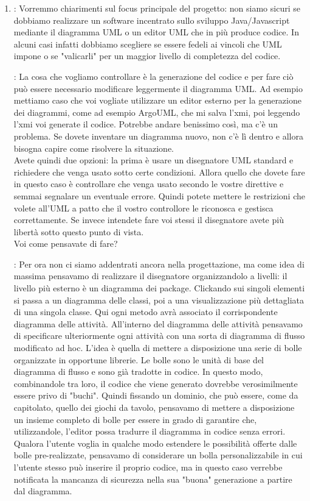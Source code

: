 \documentclass[../AnalisiDeiRequisiti.tex]{subfiles}
\begin{document}
		\begin{enumerate}
		\item
		\kaleidoscode: Vorremmo chiarimenti sul focus principale del progetto: non siamo
		sicuri se dobbiamo realizzare un software incentrato sullo sviluppo Java/Javascript
		mediante il diagramma UML o un editor UML che in più produce codice. In alcuni casi
		infatti dobbiamo scegliere se essere fedeli ai vincoli che UML impone o se
		"valicarli" per un maggior livello di completezza del codice.
		
		\proponente: La cosa che vogliamo controllare è la generazione del codice e per fare
		ciò può essere necessario modificare leggermente il diagramma UML.
		Ad esempio mettiamo caso che voi vogliate utilizzare un editor esterno per la
		generazione dei diagrammi, come ad esempio ArgoUML, che mi salva l'xmi, poi
		leggendo l'xmi voi generate il codice. Potrebbe andare benissimo così, ma c'è un
		problema. Se dovete inventare un diagramma nuovo, non c'è lì dentro e allora bisogna
		capire come risolvere la situazione.\\
		Avete quindi due opzioni: la prima è usare un disegnatore UML standard e richiedere
		che venga usato sotto certe condizioni. Allora quello che dovete fare in questo
		caso è controllare che venga usato secondo le vostre direttive e semmai segnalare
		un eventuale errore. Quindi potete mettere le restrizioni che volete all'UML a
		patto che il vostro controllore le riconosca e gestisca correttamente. Se invece
		intendete fare voi stessi il disegnatore avete più libertà sotto questo punto di
		vista.\\
		Voi come pensavate di fare?
		
		\kaleidoscode: Per ora non ci siamo addentrati ancora nella progettazione, ma come
		idea di massima pensavamo di realizzare il disegnatore organizzandolo a livelli:
		il livello più esterno è un diagramma dei package. Clickando sui singoli elementi
		si passa a un diagramma delle classi, poi a una visualizzazione più dettagliata di
		una singola classe. Qui ogni metodo avrà associato il corrispondente diagramma
		delle attività. All'interno del diagramma delle attività pensavamo di specificare
		ulteriormente ogni attività con una sorta di diagramma di flusso modificato ad hoc.
		L'idea è quella di mettere a disposizione una serie di bolle organizzate in
		opportune librerie. Le bolle sono le unità di base del diagramma di flusso e sono
		già tradotte in codice. In questo modo, combinandole tra loro, il codice che viene
		generato dovrebbe verosimilmente essere privo di "buchi". Quindi fissando un
		dominio, che può essere, come da capitolato, quello dei giochi da tavolo, pensavamo di
		mettere a disposizione un insieme completo di bolle per essere in grado di garantire
		che, utilizzandole, l'editor possa tradurre il diagramma in codice senza errori.\\
		Qualora l'utente voglia in qualche modo estendere le possibilità offerte dalle bolle
		pre-realizzate, pensavamo di considerare un bolla personalizzabile in cui l'utente
		stesso può inserire il proprio codice, ma in questo caso verrebbe notificata la mancanza
		di sicurezza nella sua "buona" generazione a partire dal diagramma.
		

\end{enumerate}
\end{document}
